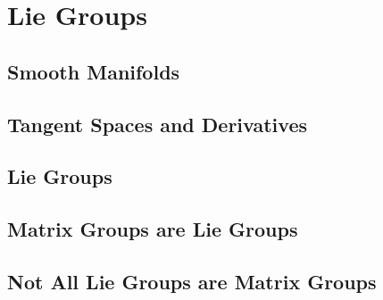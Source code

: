 \chapter{Lie Groups}

\section{Smooth Manifolds}

\section{Tangent Spaces and Derivatives}

\section{Lie Groups}

\section{Matrix Groups are Lie Groups}

\section{Not All Lie Groups are Matrix Groups}

